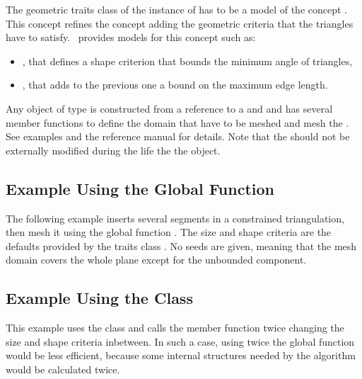 The geometric traits class of the instance of  has to be a
model of the concept .  This concept
refines the concept 
adding the geometric criteria that the triangles have to satisfy.
\cgal\ provides models for this concept such as:
\begin{itemize}
\item {}, that defines a shape criterion
  that bounds the minimum angle of triangles, 
\item {}, that adds to the previous one a
  bound on the maximum edge length.
\end{itemize}

Any object of type  is constructed from a
reference to a  and and has several member functions to define the
domain that have to be meshed and mesh the . See examples and the
reference manual for details. Note that the  should not be
externally modified during the life the the 
object.

\subsection{Example Using the Global Function}

The following example inserts several segments in a constrained
triangulation, then mesh it using the global function
. The size and shape criteria are the defaults
provided by the traits class . No seeds are
given, meaning that the mesh domain covers the whole plane except for the
unbounded component.


\subsection{Example Using the Class }

This example uses the class  and calls
  the  member function twice changing the size and
  shape criteria inbetween. In such a case, using twice the global
  function  would be less efficient,
  because some internal structures needed by the algorithm would be
  calculated twice.


